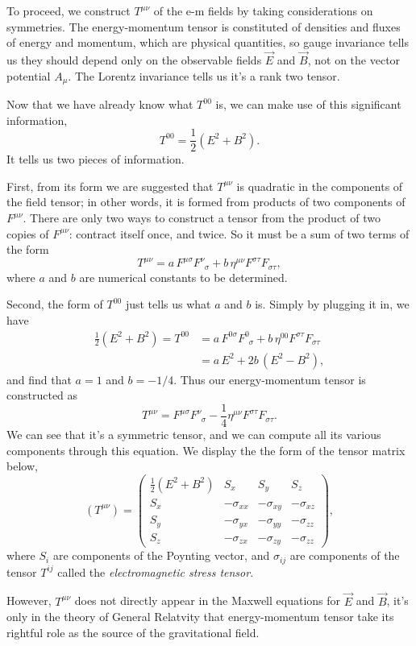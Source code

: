 \documentclass{article}
\newcommand{\be}{\begin{equation}}
\newcommand{\ee}{\end{equation}}
\newcommand{\ba}{\begin{array}}
\newcommand{\ea}{\end{array}}
\newcommand{\bs}{\be\begin{split}}
\newcommand{\1}{\left}
\newcommand{\2}{\right}
\newcommand{\m}{\mu}
\newcommand{\n}{\nu}
\begin{document}
To proceed, we construct $T^{\m\n}$ of the e-m fields by taking considerations on symmetries. The energy-momentum tensor is constituted of densities and fluxes of energy and momentum, which are physical quantities, so gauge invariance tells us they should depend only on the observable fields $\vec E$ and $\vec B$, not on the vector potential $A_\m$. The Lorentz invariance tells us it's a rank two tensor.

Now that we have already know what $T^{00}$ is, we can make use of this significant information,
\be
T^{00}=\frac1 2(E^2+B^2).
\ee
It tells us two pieces of information.

First, from its form we are suggested that $T^{\m\n}$ is quadratic in the components of the field tensor; in other words, it is formed from products of two components of $F^{\m\n}$. There are only two ways to construct a tensor from the product of two copies of $F^{\m\n}$: contract itself once, and twice. So it must be a sum of two terms of the form
\be
T^{\m\n}=a\, F^{\m\sigma}F^\n_{\phantom{\n}\sigma} + b\, \eta^{\m\n} F^{\sigma\tau}F_{\sigma\tau},
\ee
where $a$ and $b$ are numerical constants to be determined.

Second, the form of $T^{00}$ just tells us what $a$ and $b$ is. Simply by plugging it in, we have
\bs
\frac1 2(E^2+B^2)=T^{00}&=a\, F^{0\sigma}F^0_{\phantom{0}\sigma} + b\, \eta^{00} F^{\sigma\tau}F_{\sigma\tau}\\
&=a\, E^2+2b\,( E^2- B^2),
\end{split}\ee
and find that $a=1$ and $b=-1/4$. Thus our energy-momentum tensor is constructed as
\be
T^{\m\n}=F^{\m\sigma}F^\n_{\phantom{\n}\sigma} -\frac1 4\eta^{\m\n} F^{\sigma\tau}F_{\sigma\tau}.
\ee
We can see that it's a symmetric tensor, and we can compute all its various components through this equation. We display the the form of the tensor matrix below,
\be
(T^{\m\n}) = \1(\ba{cccc}\frac1 2(E^2+B^2)& S_x & S_y& S_z\\  S_x &-\sigma_{xx}&-\sigma_{xy}&-\sigma_{xz} \\ S_y&-\sigma_{yx}&-\sigma_{yy}&-\sigma_{zz}\\ S_z&-\sigma_{zx}&-\sigma_{zy}&-\sigma_{zz}  \ea\2),
\ee
where $S_i$ are components of the Poynting vector, and $\sigma_{ij}$ are components of the tensor $T^{ij}$ called the \textit{electromagnetic stress tensor}.

However, $T^{\m\n}$ does not directly appear in the Maxwell equations for $\vec E$ and $\vec B$, it's only in the theory of General Relatvity that energy-momentum tensor take its rightful role as the source of the gravitational field.\\
\end{document}
